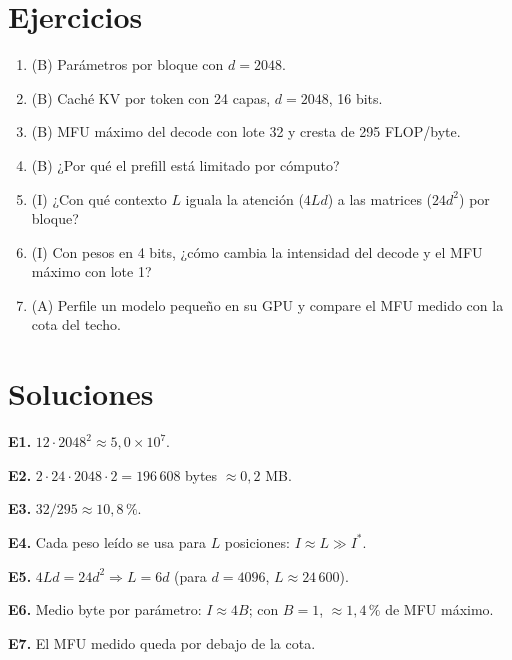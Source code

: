 \documentclass[11pt,a4paper]{article}
\begin{document}
\section{Ejercicios}
\begin{enumerate}[label=\textbf{E\arabic*.}]
\item (B) Parámetros por bloque con $d=2048$.
\item (B) Caché KV por token con 24 capas, $d=2048$, 16 bits.
\item (B) MFU máximo del decode con lote 32 y cresta de 295 FLOP/byte.
\item (B) ¿Por qué el prefill está limitado por cómputo?
\item (I) ¿Con qué contexto $L$ iguala la atención ($4Ld$) a las matrices ($24d^2$) por bloque?
\item (I) Con pesos en 4 bits, ¿cómo cambia la intensidad del decode y el MFU máximo con lote 1?
\item (A) Perfile un modelo pequeño en su GPU y compare el MFU medido con la cota del techo.
\end{enumerate}
\section{Soluciones}
\begin{solucion}
\textbf{E1.} $12\cdot2048^2\approx5{,}0\times10^7$.

\textbf{E2.} $2\cdot24\cdot2048\cdot2=196\,608$ bytes $\approx0{,}2$ MB.

\textbf{E3.} $32/295\approx10{,}8\,\%$.

\textbf{E4.} Cada peso leído se usa para $L$ posiciones: $I\approx L\gg I^\ast$.

\textbf{E5.} $4Ld=24d^2\Rightarrow L=6d$ (para $d=4096$, $L\approx24\,600$).

\textbf{E6.} Medio byte por parámetro: $I\approx4B$; con $B=1$, $\approx1{,}4\,\%$ de MFU máximo.

\textbf{E7.} El MFU medido queda por debajo de la cota.
\end{solucion}
\end{document}
